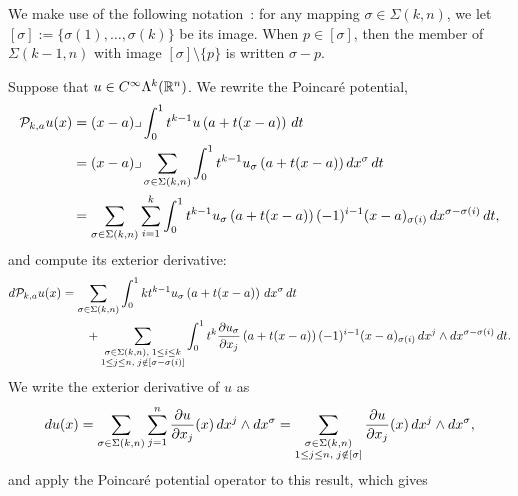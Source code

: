 \documentclass[10pt,a4paper]{article}
\begin{document}
We make use of the following notation~\cite{licht2022basis}:
for any mapping $\sigma \in \Sigma(k,n)$, we let $[\sigma] := \{ \sigma(1), \dots, \sigma(k) \}$ be its image. 
When $p \in [\sigma]$, then the member of $\Sigma(k-1,n)$ with image $[\sigma] \setminus \{p\}$ is written $\sigma-p$.

Suppose that $u \in C^{\infty}\Lambda^{k}({\mathbb R}^n)$.
We rewrite the Poincar\'e potential,
\begin{align*}
    {\mathcal P}_{k,a} u(x) 
    &= 
    (x-a)\lrcorner \int_{0}^{1} t^{k-1} u\left(a+t(x-a)\right)\,dt 
    \\&
    = 
    (x-a)\lrcorner 
    \sum_{\sigma \in \Sigma(k,n)}
    \int_{0}^{1} 
    t^{k-1} u_{\sigma}\left(a+t(x-a)\right) dx^{\sigma} \,dt 
    \\&
    = 
    \sum_{\sigma \in \Sigma(k,n)} \sum_{i=1}^{k}
    \int_{0}^{1} 
    t^{k-1} u_{\sigma}\left(a+t(x-a)\right) (-1)^{i-1} (x-a)_{\sigma(i) } \,dx^{\sigma-\sigma(i)} \,dt 
    ,
\end{align*}
and compute its exterior derivative:
\begin{align*}
    d {\mathcal P}_{k,a} u(x) 
    &= 
    \sum_{\sigma \in \Sigma(k,n)} 
    \int_{0}^{1} 
    k t^{k-1} u_{\sigma}\left(a+t(x-a)\right) \,dx^{\sigma} \,dt 
    \\&\qquad
    + 
    \sum_{\substack{ \sigma \in \Sigma(k,n), \; 1 \leq i \leq k \\ 1 \leq j \leq n, \; j \notin [\sigma-\sigma(i)] }}
    \int_{0}^{1} 
    t^{k} \frac{ \partial u_{\sigma} }{\partial x_{j}}\left(a+t(x-a)\right) (-1)^{i-1} (x-a)_{\sigma(i) } \,dx^{j} \wedge dx^{\sigma-\sigma(i)} \,dt 
    .
\end{align*}
We write the exterior derivative of $u$ as 
\begin{align}\label{math:exteriorderivative_of_u_in_hodgediscussion}
    d u(x)
    =
    \sum_{\sigma \in \Sigma(k,n)} \sum_{j=1}^{n}
    \frac{ \partial u }{\partial x_{j}}(x) \,dx^{j} \wedge dx^{\sigma} 
    =
    \sum_{\substack{ \sigma \in \Sigma(k,n) \\ 1 \leq j \leq n, \; j \notin [\sigma] }}
    \frac{ \partial u }{\partial x_{j}}(x) \,dx^{j} \wedge dx^{\sigma} 
    ,
\end{align}
and apply the Poincar\'e potential operator to this result, which gives 
\end{document}

